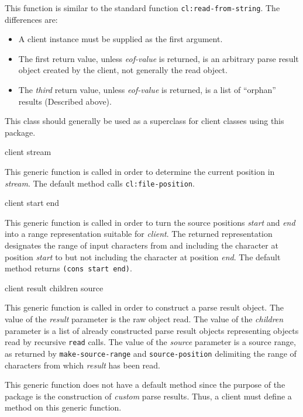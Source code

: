 This function is similar to the standard \commonlisp{} function
\texttt{cl:read-from-string}.  The differences are:

\begin{itemize}
\item A client instance must be supplied as the first argument.
\item The first return value, unless \textit{eof-value} is returned,
  is an arbitrary parse result object created by the client, not
  generally the read object.
\item The \emph{third} return value, unless \textit{eof-value} is
  returned, is a list of ``orphan'' results (Described above).
\end{itemize}


This class should generally be used as a superclass for client classes
using this package.

 {client stream}

This generic function is called in order to determine the current
position in \textit{stream}.  The default method calls
\texttt{cl:file-position}.

 {client start end}

This generic function is called in order to turn the source positions
\textit{start} and \textit{end} into a range representation suitable
for \textit{client}.  The returned representation designates the range
of input characters from and including the character at position
\textit{start} to but not including the character at position
\textit{end}.  The default method returns \texttt{(cons start end)}.

 {client result children source}

This generic function is called in order to construct a parse result
object.  The value of the \textit{result} parameter is the raw object
read.  The value of the \textit{children} parameter is a list of
already constructed parse result objects representing objects read by
recursive \texttt{read} calls.  The value of the \textit{source}
parameter is a source range, as returned by \texttt{make-source-range}
and \texttt{source-position} delimiting the range of characters from
which \textit{result} has been read.

This generic function does not have a default method since the purpose
of the package is the construction of \emph{custom} parse results.
Thus, a client must define a method on this generic function.

